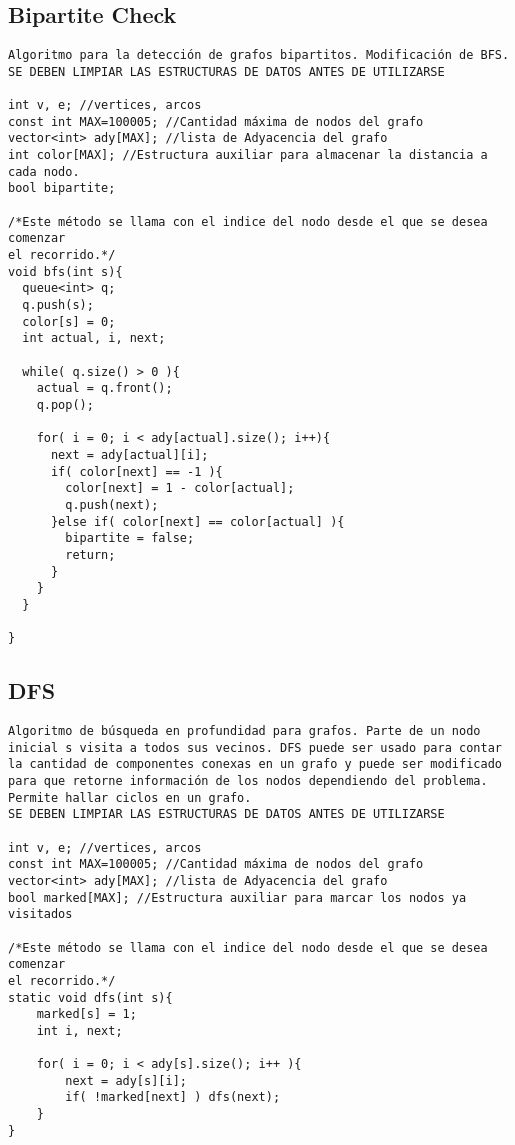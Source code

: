 \documentclass[10pt,letterpaper,twocolumn,twosided]{article}
\begin{document}
\subsection{Bipartite Check}
\begin{lstlisting}
Algoritmo para la detección de grafos bipartitos. Modificación de BFS.
SE DEBEN LIMPIAR LAS ESTRUCTURAS DE DATOS ANTES DE UTILIZARSE

int v, e; //vertices, arcos
const int MAX=100005; //Cantidad máxima de nodos del grafo
vector<int> ady[MAX]; //lista de Adyacencia del grafo
int color[MAX]; //Estructura auxiliar para almacenar la distancia a cada nodo.
bool bipartite;

/*Este método se llama con el indice del nodo desde el que se desea comenzar
el recorrido.*/
void bfs(int s){
  queue<int> q;
  q.push(s);
  color[s] = 0;
  int actual, i, next;
       
  while( q.size() > 0 ){
    actual = q.front();
    q.pop();

    for( i = 0; i < ady[actual].size(); i++){
      next = ady[actual][i];
      if( color[next] == -1 ){
        color[next] = 1 - color[actual];
        q.push(next);
      }else if( color[next] == color[actual] ){
        bipartite = false;
        return;
      }
    }
  }

}
\end{lstlisting}

\subsection{DFS}
\begin{lstlisting}
Algoritmo de búsqueda en profundidad para grafos. Parte de un nodo inicial s visita a todos sus vecinos. DFS puede ser usado para contar la cantidad de componentes conexas en un grafo y puede ser modificado para que retorne información de los nodos dependiendo del problema. Permite hallar ciclos en un grafo.
SE DEBEN LIMPIAR LAS ESTRUCTURAS DE DATOS ANTES DE UTILIZARSE

int v, e; //vertices, arcos
const int MAX=100005; //Cantidad máxima de nodos del grafo
vector<int> ady[MAX]; //lista de Adyacencia del grafo
bool marked[MAX]; //Estructura auxiliar para marcar los nodos ya visitados

/*Este método se llama con el indice del nodo desde el que se desea comenzar
el recorrido.*/
static void dfs(int s){
	marked[s] = 1;
	int i, next;

	for( i = 0; i < ady[s].size(); i++ ){
		next = ady[s][i];
		if( !marked[next] )	dfs(next);
	}
}
\end{lstlisting}
\end{document}
